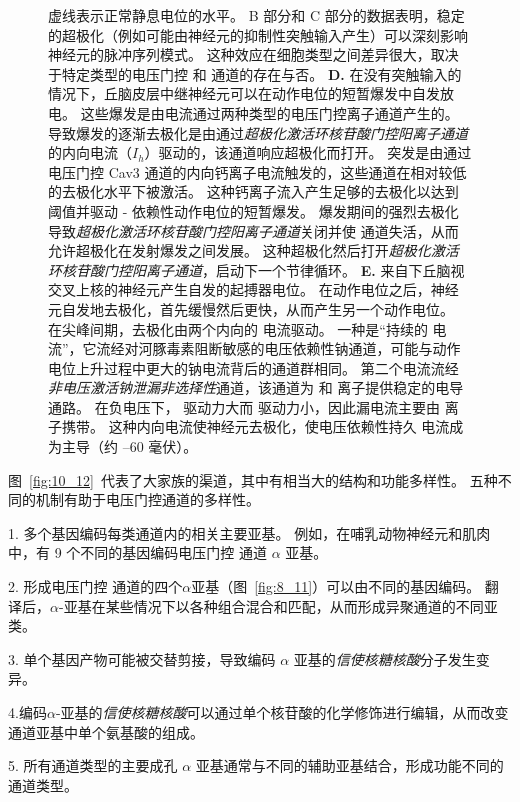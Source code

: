 \begin{figure}[htbp]
{		虚线表示正常静息电位的水平\cite{llinas1982electrophysiology}。
		B 部分和 C 部分的数据表明，稳定的超极化（例如可能由神经元的抑制性突触输入产生）可以深刻影响神经元的脉冲序列模式。
		这种效应在细胞类型之间差异很大，取决于特定类型的电压门控  和  通道的存在与否。
		\textbf{D.} 在没有突触输入的情况下，丘脑皮层中继神经元可以在动作电位的短暂爆发中自发放电。
		这些爆发是由电流通过两种类型的电压门控离子通道产生的。
		导致爆发的逐渐去极化是由通过\textit{超极化激活环核苷酸门控阳离子通道}的内向电流（$I_h$）驱动的，该通道响应超极化而打开。
		突发是由通过电压门控 Cav3 通道的内向钙离子电流触发的，这些通道在相对较低的去极化水平下被激活。
		这种钙离子流入产生足够的去极化以达到阈值并驱动 - 依赖性动作电位的短暂爆发。
		爆发期间的强烈去极化导致\textit{超极化激活环核苷酸门控阳离子通道}关闭并使  通道失活，从而允许超极化在发射爆发之间发展。
		这种超极化然后打开\textit{超极化激活环核苷酸门控阳离子通道}，启动下一个节律循环\cite{mccormick1992model}。
		\textbf{E.} 来自下丘脑视交叉上核的神经元产生自发的起搏器电位。
		在动作电位之后，神经元自发地去极化，首先缓慢然后更快，从而产生另一个动作电位。
		在尖峰间期，去极化由两个内向的  电流驱动。
		一种是“持续的  电流”，它流经对河豚毒素阻断敏感的电压依赖性钠通道，可能与动作电位上升过程中更大的钠电流背后的通道群相同。
		第二个电流流经\textit{非电压激活钠泄漏非选择性}通道，该通道为  和  离子提供稳定的电导通路。
		在负电压下， 驱动力大而  驱动力小，因此漏电流主要由  离子携带。
		这种内向电流使神经元去极化，使电压依赖性持久  电流成为主导（约 –60 毫伏）\cite{jackson2004mechanism}。}
	\label{fig:10_15}
\end{figure}


图~\ref{fig:10_12}~代表了大家族的渠道，其中有相当大的结构和功能多样性。
五种不同的机制有助于电压门控通道的多样性。


1. 多个基因编码每类通道内的相关主要亚基。
例如，在哺乳动物神经元和肌肉中，有 9 个不同的基因编码电压门控  通道 $\alpha$ 亚基。


2. 形成电压门控  通道的四个$\alpha$亚基（图~\ref{fig:8_11}）可以由不同的基因编码。
翻译后，$\alpha$-亚基在某些情况下以各种组合混合和匹配，从而形成异聚通道的不同亚类。


3. 单个基因产物可能被交替剪接，导致编码 $\alpha$ 亚基的\textit{信使核糖核酸}分子发生变异。


4.编码$\alpha$-亚基的\textit{信使核糖核酸}可以通过单个核苷酸的化学修饰进行编辑，从而改变通道亚基中单个氨基酸的组成。


5. 所有通道类型的主要成孔 $\alpha$ 亚基通常与不同的辅助亚基结合，形成功能不同的通道类型。


